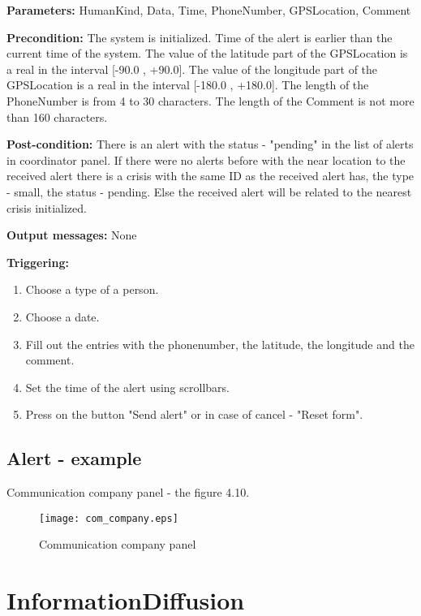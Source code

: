 \begin{description}
	\item \textbf{Parameters:} HumanKind, Data, Time, PhoneNumber, GPSLocation,
	Comment
	\item \textbf{Precondition:} The system is initialized. Time of the alert is
	earlier than the current time of the system. The value of the latitude part
	of the GPSLocation is a real in the interval [-90.0 , +90.0]. The value of the longitude part
	of the GPSLocation is a	real in the interval [-180.0 , +180.0]. The length of
	the PhoneNumber is from 4 to 30 characters. The length of the Comment is
	not more than 160 characters.
	\item \textbf{Post-condition:} There is an alert with the status - "pending" in
	the list of alerts in coordinator panel. If there were no alerts before with the
	near location to the received alert there is a crisis with
	the same ID as the received alert has, the type - small, the status - pending.
	Else the received alert will be related to the nearest crisis initialized. 
	\item \textbf{Output messages:} None
	
	\item \textbf{Triggering:}
	
	\begin{enumerate}
		\item Choose a type of a person.
		\item Choose a date.
		\item Fill out the entries with the phonenumber, the latitude, the longitude
		and the comment.
		\item Set the time of the alert using scrollbars.
		\item Press on the button "Send alert" or in case of cancel - "Reset form".
	\end{enumerate}
\end{description}

\subsection{Alert - example}
Communication company panel - the figure 4.10.
\begin{figure}
    \texttt{[image: com\_company.eps]}
	\caption{Communication company panel}
\end{figure}


\section{InformationDiffusion}
\label{operation:InformationDiffusion}

